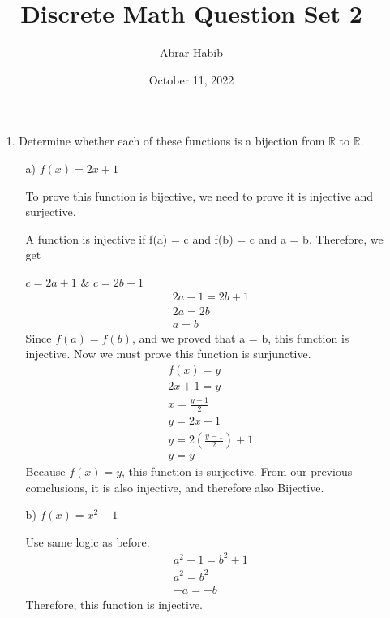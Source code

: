 \documentclass[letterpaper,11pt]{article}
\begin{document}
\title{Discrete Math Question Set 2}
\author{Abrar Habib}
\date{October 11, 2022}
\maketitle


\begin{enumerate}
    \item[1.] Determine whether each of these functions is a bijection from $\mathbb{R}$  to $\mathbb{R}$.
    \begin{enumerate}
      \item[a)] $f(x) = 2x + 1$
      \item[] To prove this function is bijective, we need to prove it is injective and surjective.
      
      A function is injective if f(a) = c and f(b) = c and a = b. Therefore, we get
      
      $c=2a+1$ \& $c = 2b +1$
      \begin{equation}
        \begin{aligned}
            & 2a+1 = 2b+1 &\\
            & 2a = 2b &\\
            & a = b
        \end{aligned}
      \end{equation} 
      Since $f(a) = f(b)$, and we proved that a = b, this function is injective. Now we must prove this function is surjunctive.
      \begin{equation}
        \begin{aligned}
            & f(x) = y &\\
            & 2x+1 = y &\\
            & x = \frac{y-1}{2} &\\
            & y = 2x+1 &\\
            & y = 2(\frac{y-1}{2}) + 1 &\\
            & y = y
        \end{aligned}
      \end{equation} 
      Because $f(x) = y$, this function is surjective. From our previous comclusions, it is also injective, and therefore also Bijective.

      \item[b)] $f(x) = x^2+1$ 
      \item[] Use same logic as before.
      \begin{equation}
        \begin{aligned}
            & a^2+1 = b^2+1 &\\
            & a^2 = b^2 &\\
            & \pm a = \pm b
        \end{aligned}
      \end{equation} 
      Therefore, this function is injective.


\end{enumerate}
\end{enumerate}
\end{document}
